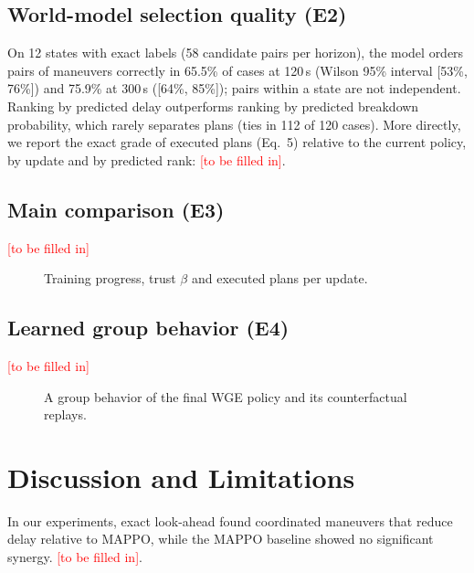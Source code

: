 \documentclass[conference]{IEEEtran}
\newcommand{\tbf}{\textcolor{red}{[to be filled in]}}
\newcommand{\phbox}[1]{\fbox{\parbox[c][#1][c]{0.95\columnwidth}{\centering\Large \textcolor{red}{[to be filled in]}}}}
\begin{document}
\subsection{World-model selection quality (E2)}
On 12 states with exact labels (58 candidate pairs per horizon), the model orders pairs of maneuvers correctly in 65.5\% of cases at 120\,s (Wilson 95\% interval [53\%, 76\%]) and 75.9\% at 300\,s ([64\%, 85\%]); pairs within a state are not independent. %
Ranking by predicted delay outperforms ranking by predicted breakdown probability, which rarely separates plans (ties in 112 of 120 cases). %
More directly, we report the exact grade of executed plans (Eq.~5) relative to the current policy, by update and by predicted rank: \tbf.

\subsection{Main comparison (E3)}
\tbf

\begin{table}[t]
\caption{Delay difference relative to each reference (veh-s, 95\% CI; negative is better).}
\label{tab:main}
\centering
\phbox{3.2cm}
\end{table}

\begin{figure}[t]
\centering
\phbox{4.2cm}
\caption{Training progress, trust $\beta$ and executed plans per update.}
\label{fig:curves}
\end{figure}

\subsection{Learned group behavior (E4)}
\tbf

\begin{figure}[t]
\centering
\phbox{4.2cm}
\caption{A group behavior of the final WGE policy and its counterfactual replays.}
\label{fig:behavior}
\end{figure}

\section{Discussion and Limitations}

In our experiments, exact look-ahead found coordinated maneuvers that reduce delay relative to MAPPO, while the MAPPO baseline showed no significant synergy. \tbf.
\end{document}
